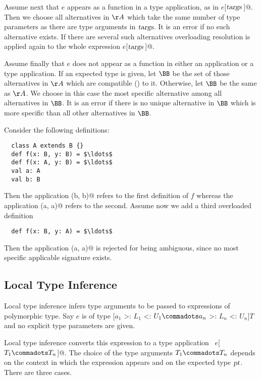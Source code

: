 Assume next that $e$ appears as a function in a type application, as
in \lstinline@$e$[$\mbox{\sl targs}\,$]@. Then we choose all alternatives in
$\AA$ which take the same number of type parameters as there are type
arguments in $\mbox{\sl targs}$. It is an error if no such alternative exists.
If there are several such alternatives overloading resolution is
applied again to the whole expression \lstinline@$e$[$\mbox{\sl targs}\,$]@.  

Assume finally that $e$ does not appear as a function in either
an application or a type application. If an expected type is given,
let $\BB$ be the set of those alternatives in $\AA$ which are
compatible () to it. Otherwise, let $\BB$ be the same as $\AA$.
We choose in this case the most specific alternative among all
alternatives in $\BB$. It is an error if there is no unique
alternative in $\BB$ which is more specific than all other
alternatives in $\BB$.

\example Consider the following definitions:

\begin{lstlisting}
  class A extends B {}
  def f(x: B, y: B) = $\ldots$
  def f(x: A, y: B) = $\ldots$
  val a: A 
  val b: B
\end{lstlisting}
Then the application \lstinline@f(b, b)@ refers to the first
definition of $f$ whereas the application \lstinline@f(a, a)@
refers to the second.  Assume now we add a third overloaded definition
\begin{lstlisting}
  def f(x: B, y: A) = $\ldots$
\end{lstlisting}
Then the application \lstinline@f(a, a)@ is rejected for being ambiguous, since
no most specific applicable signature exists.

\subsection{Local Type Inference}
\label{sec:local-type-inf}

Local type inference infers type arguments to be passed to expressions
of polymorphic type. Say $e$ is of type [$a_1$ >: $L_1$ <: $U_1
\commadots a_n$ >: $L_n$ <: $U_n$]$T$ and no explicit type parameters
are given. 

Local type inference converts this expression to a type
application ~\lstinline@$e$[$T_1 \commadots T_n$]@. The choice of the
type arguments $T_1 \commadots T_n$ depends on the context in which
the expression appears and on the expected type $\mbox{\sl pt}$. 
There are three cases.

